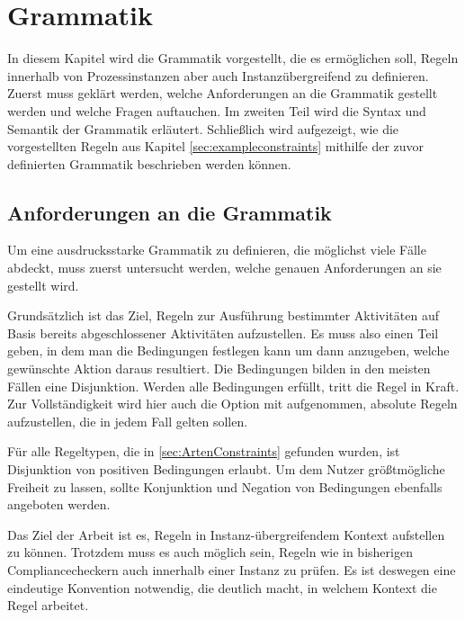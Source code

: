 
\chapter{Grammatik} %

\label{GrammatikKapitel} %


In diesem Kapitel wird die Grammatik vorgestellt, die es ermöglichen soll, Regeln innerhalb von Prozessinstanzen aber auch Instanzübergreifend zu definieren. Zuerst muss geklärt werden, welche Anforderungen an die Grammatik gestellt werden und welche Fragen auftauchen. Im zweiten Teil wird die Syntax und Semantik der Grammatik erläutert. Schließlich wird aufgezeigt, wie die vorgestellten Regeln aus Kapitel \ref{sec:exampleconstraints} mithilfe der zuvor definierten Grammatik beschrieben werden können.

%
%
\section{Anforderungen an die Grammatik}
Um eine ausdrucksstarke Grammatik zu definieren, die möglichst viele Fälle abdeckt, muss zuerst untersucht werden, welche genauen Anforderungen an sie gestellt wird.

Grundsätzlich ist das Ziel, Regeln zur Ausführung bestimmter Aktivitäten auf Basis bereits abgeschlossener Aktivitäten aufzustellen. Es muss also einen Teil geben, in dem man die Bedingungen festlegen kann um dann anzugeben, welche gewünschte Aktion daraus resultiert. Die Bedingungen bilden in den meisten Fällen eine Disjunktion. Werden alle Bedingungen erfüllt, tritt die Regel in Kraft. Zur Vollständigkeit wird hier auch die Option mit aufgenommen, absolute Regeln aufzustellen, die in jedem Fall gelten sollen.

Für alle Regeltypen, die in \ref{sec:ArtenConstraints} gefunden wurden, ist Disjunktion von positiven Bedingungen erlaubt. Um dem Nutzer größtmögliche Freiheit zu lassen, sollte Konjunktion und Negation von Bedingungen ebenfalls angeboten werden.

Das Ziel der Arbeit ist es, Regeln in Instanz-übergreifendem Kontext aufstellen zu können. Trotzdem muss es auch möglich sein, Regeln wie in bisherigen Compliancecheckern auch innerhalb einer Instanz zu prüfen. Es ist deswegen eine eindeutige Konvention notwendig, die deutlich macht, in welchem Kontext die Regel arbeitet.

